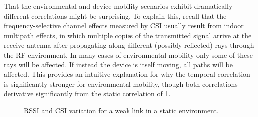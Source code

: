 That the environmental and device mobility scenarios exhibit dramatically different correlations might be surprising. To explain this, recall that the frequency-selective channel effects measured by CSI usually result from indoor multipath effects, in which multiple copies of the transmitted signal arrive at the receive antenna after propagating along different (possibly reflected) rays through the RF environment. In many cases of environmental mobility only some of these rays will be affected. If instead the device is itself moving, all paths will be affected. This provides an intuitive explanation for why the temporal correlation is significantly stronger for environmental mobility, though both correlations derivative significantly from the static correlation of 1.

\begin{figure}[tp]
	\centering
	\hspace{0.03\textwidth}%
	\caption[RSSI and CSI variation for a weak link in a static environment]{\label{fig:mobility_example_weak}RSSI and CSI variation for a weak link in a static environment.}
\end{figure}

